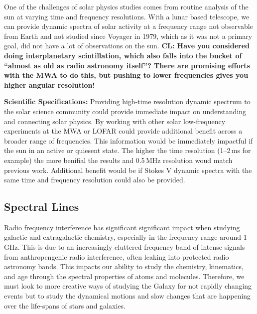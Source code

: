 One of the challenges of solar physics studies comes from routine analysis of the sun at varying time and frequency resolutions. With a lunar based telescope, we can provide dynamic spectra of solar activity at a frequency range not observable from Earth and not studied since Voyager in 1979, which as it was not a primary goal, did not have a lot of observations on the sun.
\textbf{CL: Have you considered doing interplanetary scintillation, which also falls into the bucket of ``almost as old as radio astronomy itself''? There are promising efforts with the MWA to do this, but pushing to lower frequencies gives you higher angular resolution!}

\textbf{Scientific Specifications:} Providing high-time resolution dynamic spectrum to the solar science community could provide immediate impact on understanding and connecting solar physics. By working with other solar low-frequency experiments at the MWA or LOFAR could provide additional benefit across a broader range of frequencies. This information would be immediately impactful if the sun in an active or quiesent state. The higher the time resolution (1--2\,ms for example) the more benifial the results and 0.5\,MHz resolution woud match previous work. Additional benefit would be if Stokes V dynamic spectra with the same time and frequency resolution could also be provided.

\subsection{Spectral Lines}
Radio frequency interference has significant significant impact when studying galactic and extragalactic chemistry, especially in the frequency range around 1\,GHz. This is due to an increasingly cluttered frequency band of intense signals from anthropengenic radio interference, often leaking into protected radio astronomy bands. This impacts our ability to study the chemistry, kinematics, and age through the spectral properties of atoms and molecules. Therefore, we must look to more creative ways of studying the Galaxy for not rapidly changing events but to study the dynamical motions and slow changes that are happening over the life-spans of stars and galaxies.




